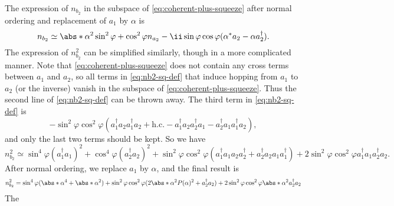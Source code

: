 
The expression of $n_{b_2}$ 
in the subspace of \eqref{eq:coherent-plus-squeeze}
after normal ordering and replacement of $a_1$ by $\alpha$ is 
\begin{equation}
    n_{b_2} \simeq \abs*{\alpha}^2 \sin^2 \varphi + \cos^2 \varphi n_{a_2} 
    - \ii \sin \varphi \cos \varphi (\alpha^* a_2 - \alpha a_2^\dagger).
\end{equation}
The expression of $n_{b_2}^2$ can be simplified similarly,
though in a more complicated manner.
Note that \eqref{eq:coherent-plus-squeeze} does not contain any cross terms between $a_1$ and $a_2$,
so all terms in \eqref{eq:nb2-sq-def} that induce hopping from $a_1$ to $a_2$ (or the inverse) 
vanish in the subspace of \eqref{eq:coherent-plus-squeeze}.
Thus the second line of \eqref{eq:nb2-sq-def} can be thrown away.
The third term in \eqref{eq:nb2-sq-def} is 
\[
    - \sin^2 \varphi \cos^2 \varphi (
        a_1^\dagger a_2 a_1^\dagger a_2 + \text{h.c.}
        - a_1^\dagger a_2 a_2^\dagger a_1 - a_2^\dagger a_1 a_1^\dagger a_2
    ),
\]
and only the last two terms should be kept.
So we have 
\[
    n^2_{b_2} \simeq \sin^4 \varphi (a_1^\dagger a_1)^2 + \cos^4 \varphi (a_2^\dagger a_2)^2
    + \sin^2 \varphi \cos^2 \varphi (a_1^\dagger a_1 a_2 a_2^\dagger + a_2^\dagger a_2 a_1 a_1^\dagger)
    +2 \sin^2 \varphi \cos^2 \varphi a_1^\dagger a_1 a_2^\dagger a_2.
\]
After normal ordering, we replace $a_1$ by $\alpha$, and the final result is 
\begin{equation}
    \begin{aligned}
        n_{b_2}^2 &= \sin^4 \varphi (\abs*{\alpha}^4 + \abs*{\alpha}^2) + \sin^2 \varphi \cos^2 \varphi (2 \abs*{\alpha}^2 P(\alpha)^2 + a_2^\dagger a_2) + 2 \sin^2 \varphi \cos^2 \varphi \abs*{\alpha}^2 a_2^\dagger a_2 \\
    \end{aligned}
    \label{eq:nb2-square-mf}
\end{equation}
The 

